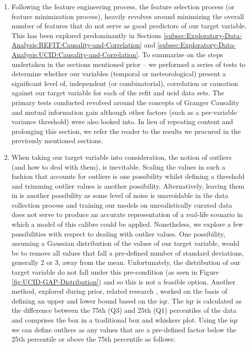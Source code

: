 \begin{adjustwidth}{-1.65cm}{-0.0cm}
\begin{enumerate}[label=Step 3.\arabic*:, leftmargin=*]
    \item Following the feature engineering process, the feature selection process (or feature minimization process), heavily revolves around minimizing the overall number of features that do not serve as good predictors of our target variable. This has been explored predominantly in Sections \ref{subsec:Exploratory-Data-Analysis:REFIT:Causality-and-Correlation} and \ref{subsec:Exploratory-Data-Analysis:UCID:Causality-and-Correlation}. To summarize on the steps undertaken in the sections mentioned prior -- we performed a series of tests to determine whether our variables (temporal or meteorological) present a significant level of, independent (or combinatorial), correlation or causation against our target variable for each of the \gls{refit} and \gls{ucid} data sets. The primary tests conducted revolved around the concepts of Granger Causality and mutual information gain although other factors (such as a per-variable variance threshold) were also looked into. In lieu of repeating content and prolonging this section, we refer the reader to the results we procured in the previously mentioned sections.
    
    \item When taking our target variable into consideration, the notion of outliers (and how to deal with them), is inevitable. Scaling the values in such a fashion that accounts for outliers is one possibility whilst defining a threshold and trimming outlier values is another possibility. Alternatively, leaving them in is another possibility as some level of noise is unavoidable in the data collection process and training our models on unrealistically curated data does not serve to produce an accurate representation of a real-life scenario in which a model of this calibre could be applied. Nonetheless, we explore a few possibilities with respect to dealing with outlier values. One possibility, assuming a Gaussian distribution of the values of our target variable, would be to remove all values that fall a pre-defined number of standard deviations, generally 2 or 3, away from the mean. Unfortunately, the distribution of our target variable do not fall under this pre-condition (as seen in Figure \ref{fig:UCID-GAP-Distribution}) and so this is not a feasible option. Another method, explored during prior, related research \cite{Kareem}, worked on the basis of defining an upper and lower bound based on the \gls{iqr}. The \gls{iqr} is calculated as the difference between the 75th (Q3) and 25th (Q1) percentiles of the data and comprises the box in a traditional box and whiskers plot. Using the \gls{iqr} we can define outliers as any values that are a pre-defined factor below the 25th percentile or above the 75th percentile as follows:
    

\end{enumerate}
\end{adjustwidth}
